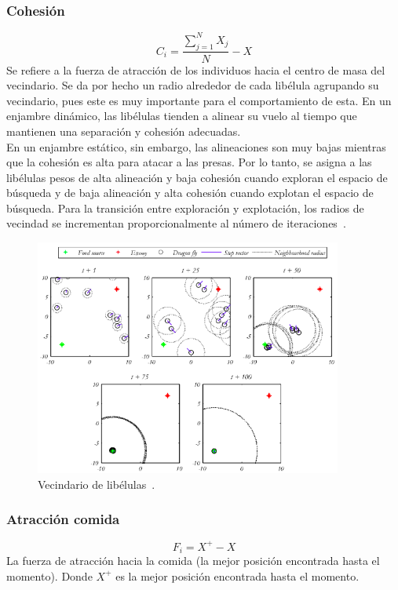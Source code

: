 \subsubsection{Cohesión}
\begin{equation}
    C_i = \frac{\sum_{j=1}^N X_j}{N} - X
\end{equation}
Se refiere a la fuerza de atracción de los individuos hacia el centro de masa del vecindario. Se da por hecho un radio alrededor de cada libélula agrupando su vecindario, pues este es muy importante para el comportamiento de esta. En un enjambre dinámico, las libélulas tienden a alinear su vuelo al tiempo que mantienen una separación y cohesión adecuadas.\\[6pt]
En un enjambre estático, sin embargo, las alineaciones son muy bajas mientras que la cohesión es alta para atacar a las presas. Por lo tanto, se asigna a las libélulas pesos de alta alineación y baja cohesión cuando exploran el espacio de búsqueda y de baja alineación y alta cohesión cuando explotan el espacio de búsqueda. Para la transición entre exploración y explotación, los radios de vecindad se incrementan proporcionalmente al número de iteraciones~\cite{mirjalili_dragonfly_2016}.
\begin{figure}[H]
    \centering
    \includegraphics[width=0.9\textwidth]{imagenes/da-operators.png}
    \caption[Vecindario de libélulas]{Vecindario de libélulas~\cite{mirjalili_dragonfly_2016}.}
\end{figure}

\subsubsection{Atracción comida}
\begin{equation}
    F_i = X^+ - X
\end{equation}
La fuerza de atracción hacia la comida (la mejor posición encontrada hasta el momento). Donde $X^+$ es la mejor posición encontrada hasta el momento.


